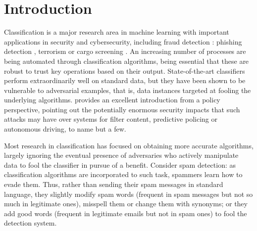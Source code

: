 
\section{Introduction}



Classification is a major research area in machine learning with important applications  in security and cybersecurity, including fraud detection \parencite{bolton2002statistical}: phishing detection \parencite{rakesh}, terrorism \parencite{terror} or cargo screening \parencite{cargo}. An increasing number of processes are being automated through classification algorithms, being essential that these are robust to trust key operations based on their output. State-of-the-art classifiers perform extraordinarily well on standard data, but they have been shown to be vulnerable to adversarial examples, that is, data instances targeted at fooling the underlying algorithms. \textcite{comiter} provides an excellent introduction from a policy perspective, pointing out the potentially enormous security impacts that such attacks may have over systems for filter content, predictive policing or autonomous driving, to name but a few. 

Most research in classification has focused on obtaining more accurate algorithms, largely ignoring the eventual presence of adversaries who actively manipulate data to fool the classifier in pursue of a benefit. Consider 
spam detection: as classification algorithms are incorporated to such task,
spammers learn how to evade them. Thus, rather than sending their spam messages in standard language, they 
 slightly modify spam words (frequent in spam messages but not 
so much in legitimate ones), misspell them or 
change them with synonyms; or they add good words (frequent in legitimate emails but not in spam ones) to fool the detection system. %

